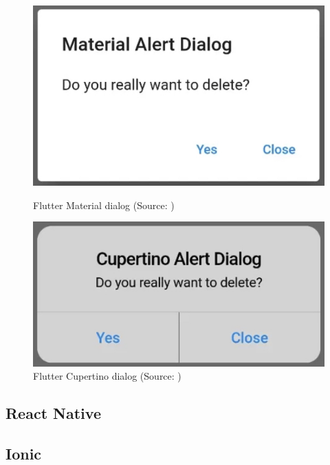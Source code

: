 \begin{figure}[h]
	\begin{minipage}{.47\textwidth}
		\includegraphics[width=\textwidth]{img/flutter_material_dialog}
		\caption{Flutter Material dialog (Source: \cite{flutter_campus_dialog})}
		\label{fig:flutter_material_dialog}
	\end{minipage}
	\hfill
	\begin{minipage}{.47\textwidth}
		\includegraphics[width=\textwidth]{img/flutter_cupertino_dialog}
		\caption{Flutter Cupertino dialog (Source: \cite{flutter_campus_dialog})}
		\label{fig:flutter_cupertino_dialog}
	\end{minipage}
\end{figure}

\subsection{React Native}



\subsection{Ionic}



